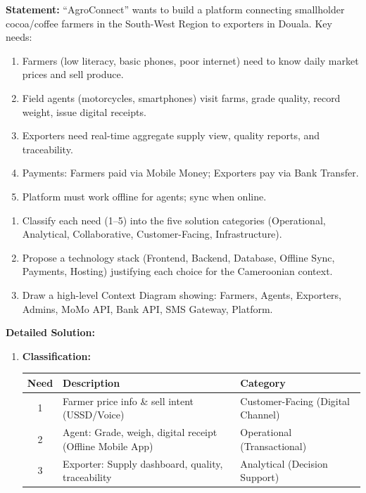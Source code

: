 \documentclass[11pt]{article}
\begin{document}
\begin{exoresolu}
\textbf{Statement:} ``AgroConnect'' wants to build a platform connecting smallholder cocoa/coffee farmers in the South-West Region to exporters in Douala. Key needs:
\begin{enumerate}
    \item Farmers (low literacy, basic phones, poor internet) need to know daily market prices and sell produce.
    \item Field agents (motorcycles, smartphones) visit farms, grade quality, record weight, issue digital receipts.
    \item Exporters need real-time aggregate supply view, quality reports, and traceability.
    \item Payments: Farmers paid via Mobile Money; Exporters pay via Bank Transfer.
    \item Platform must work offline for agents; sync when online.
\end{enumerate}
\begin{enumerate}
    \item Classify each need (1--5) into the five solution categories (Operational, Analytical, Collaborative, Customer-Facing, Infrastructure).
    \item Propose a technology stack (Frontend, Backend, Database, Offline Sync, Payments, Hosting) justifying each choice for the Cameroonian context.
    \item Draw a high-level Context Diagram showing: Farmers, Agents, Exporters, Admins, MoMo API, Bank API, SMS Gateway, Platform.
\end{enumerate}
\tcblower
\textbf{Detailed Solution:}
\begin{enumerate}
    \item \textbf{Classification:}
    \begin{center}
    \begin{tabularx}{\linewidth}{|c|X|l|}\hline
    \rowcolor{popblueL} \textbf{Need} & \textbf{Description} & \textbf{Category} \\ \hline
    1 & Farmer price info \& sell intent (USSD/Voice) & Customer-Facing (Digital Channel) \\ \hline
    2 & Agent: Grade, weigh, digital receipt (Offline Mobile App) & Operational (Transactional) \\ \hline
    3 & Exporter: Supply dashboard, quality, traceability & Analytical (Decision Support) \\ \hline

\end{tabularx}
\end{center}
\end{enumerate}
\end{exoresolu}
\end{document}

